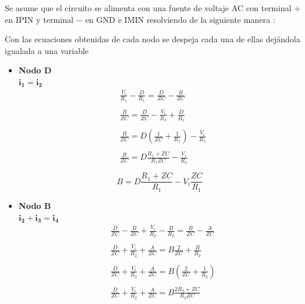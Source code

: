 Se asume que el circuito se alimenta con una fuente de voltaje AC con terminal $+$ en IPIN y terminal $-$ en GND e IMIN resolviendo de la siguiente manera :
\\  
\begin{equation}\label{Nodo D}
\end{equation}

Con las ecuaciones obtenidas de cada nodo se despeja cada una de ellas dejándola igualada a una variable 
\begin{itemize}
    \item \textbf{Nodo D} \\
    $\mathbf{i_{1}=i_{2}}$
    \begin{align*}
        &\frac{V_{i}}{R_{1}}-\frac{D}{R_{1}} = \frac{D}{ZC}-\frac{B}{ZC} \\\\
        &\frac{B}{ZC} = \frac{D}{ZC}- \frac{V_{i}}{R_{1}} + \frac{D}{R_{1}} \\\\
        &\frac{B}{ZC} = D(\frac{1}{ZC} +\frac{1}{R_{1}}) - \frac{V_{i}}{R_{1}} \\\\
        &\frac{B}{ZC} = D\frac{R_{1}+ZC}{R_{1}ZC} - \frac{V_{i}}{R_{1}} \\\\
    \end{align*}
    \begin{equation}\label{Nodo D}
        B = D\frac{R_{1}+ZC}{R_{1}} - V_{i}\frac{ZC}{R_{1}}
    \end{equation}
        \item \textbf{Nodo B} \\
        $ \mathbf{i_{2} + i_{3} = i_{4}}$
        \begin{align*}
            &\frac{D}{ZC} - \frac{B}{ZC} + \frac{V_{i}}{R_{2}}-\frac{B}{R_{2}} = \frac{B}{ZC} - \frac{A}{ZC}\\\\
            &\frac{D}{ZC}  + \frac{V_{i}}{R_{2}} + \frac{A}{ZC} = B\frac{2}{ZC}  + \frac{B}{R_{2}} \\\\
            &\frac{D}{ZC}  + \frac{V_{i}}{R_{2}} + \frac{A}{ZC} = B(\frac{2}{ZC}  + \frac{1}{R_{2}}) \\\\
            &\frac{D}{ZC}  + \frac{V_{i}}{R_{2}} + \frac{A}{ZC} = B\frac{2R_{2}+ZC}{R_{2}ZC}
        \end{align*}
        \begin{equation}\label{Nodo B}

\end{equation}
\end{itemize}
